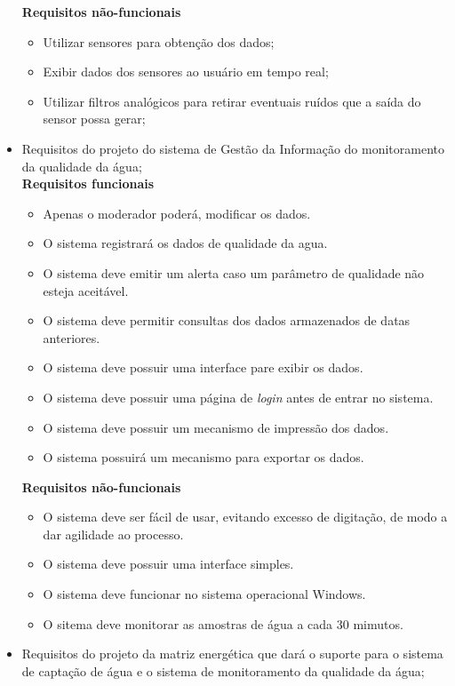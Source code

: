 \begin{itemize}
	\textbf{Requisitos não-funcionais}
	\begin{itemize}
	  \item Utilizar sensores para obtenção dos dados;
	  \item Exibir dados dos sensores ao usuário em tempo real;
	  \item Utilizar filtros analógicos para retirar eventuais ruídos que a saída do sensor possa gerar;
	\end{itemize}
	
      \item Requisitos do projeto do sistema de Gestão da Informação do monitoramento da qualidade da água;\\
	 
	 \textbf{Requisitos funcionais}
	  \begin{itemize}
	   \item Apenas o moderador poderá, modificar os dados.
	   \item O sistema registrará os dados de qualidade da agua.
	   \item O sistema deve emitir um alerta caso um parâmetro de qualidade não esteja aceitável.
	   \item O sistema deve permitir consultas dos dados armazenados de datas anteriores.
	   \item O sistema deve possuir uma interface pare exibir os dados.
	   \item O sistema deve possuir uma página de \textit{login} antes de entrar no sistema.
	   \item O sistema deve possuir um mecanismo de impressão dos dados.
	   \item O sistema possuirá um mecanismo para exportar os dados.
	  \end{itemize}
	  
	  \textbf{Requisitos não-funcionais}
	  \begin{itemize}
	   \item O sistema deve ser fácil de usar, evitando excesso de digitação, de modo a dar agilidade ao processo.
	   \item O sistema deve possuir uma interface simples.
	   \item O sistema deve funcionar no sistema operacional Windows.
	   \item O sitema deve monitorar as amostras de água a cada 30 mimutos.
	  \end{itemize}
      
      \item Requisitos do projeto da matriz energética que dará o suporte para o sistema de captação de água e o sistema de monitoramento da qualidade da água;\\
      

\end{itemize}
